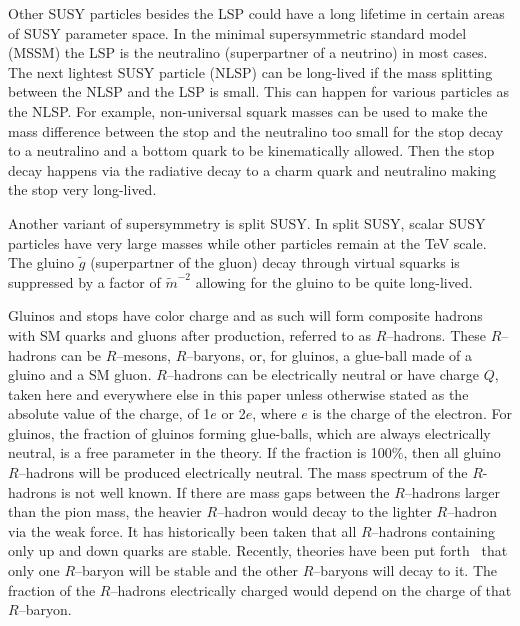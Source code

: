 Other SUSY particles besides the LSP could have a long lifetime in certain areas of SUSY parameter space. In the minimal supersymmetric standard model (MSSM) the LSP is the
neutralino (superpartner of a neutrino) in most cases. The next lightest SUSY particle (NLSP) can be long-lived if the mass splitting between the NLSP and the LSP is small.
This can happen for various particles as the NLSP. 
For example, non-universal squark masses can be used to make the mass difference between the stop and the neutralino too small for the stop decay to a neutralino and
a bottom quark to be kinematically allowed.
Then the stop decay happens via the radiative decay to a charm quark and neutralino making the stop very long-lived.

Another variant of supersymmetry is split SUSY. In split SUSY, scalar SUSY particles have very large masses while other particles remain at the TeV scale.
The gluino $\tilde{g}$ (superpartner of the gluon) decay through virtual squarks is suppressed by a factor of $\tilde{m}^{-2}$ allowing for the gluino to be quite long-lived.

Gluinos and stops have color charge and as such will form composite hadrons with SM quarks and gluons after production, referred to as $R$--hadrons.
These $R$--hadrons can be $R$--mesons, $R$--baryons, or, for gluinos, a glue-ball made of a gluino and a SM gluon.
$R$--hadrons can be electrically neutral or have charge $Q$, taken here and everywhere else in this paper unless otherwise stated as the absolute value of the charge,
of 1$e$ or 2$e$, where $e$ is the charge of the electron.
For gluinos, the fraction of gluinos forming glue-balls, which are always electrically neutral, is
a free parameter in the theory. If the fraction is 100\%, then all gluino $R$--hadrons will be produced electrically neutral.
The mass spectrum of the $R$-hadrons is not well known.
If there are mass gaps between the $R$--hadrons larger than the pion mass, the heavier $R$--hadron would decay to the lighter $R$--hadron via the weak force.
It has historically been taken that all $R$--hadrons containing only up and down quarks are stable.
Recently, theories have been put forth~\cite{Mackeprang:2009ad} that only one $R$--baryon will be stable and the other $R$--baryons will decay to it.
The fraction of the $R$--hadrons electrically charged would depend on the charge of that $R$--baryon.


